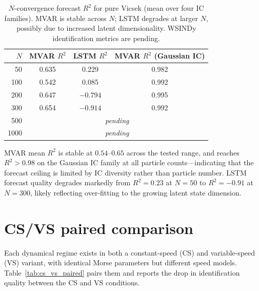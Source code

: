 \begin{table}[ht]
\centering
\caption{$N$-convergence forecast $R^2$ for pure Vicsek (mean over four
IC families).  MVAR is stable across $N$; LSTM degrades at larger $N$,
possibly due to increased latent dimensionality.  WSINDy identification
metrics are pending.}
\label{tab:n_convergence_forecast}
\renewcommand{\arraystretch}{0.95}
\small
\begin{tabular}{rccc}
\toprule
$N$ & \textbf{MVAR} $R^2$ & \textbf{LSTM} $R^2$ & \textbf{MVAR} $R^2$ (Gaussian IC) \\
\midrule
  50  & 0.635 &  0.229 & 0.982 \\
 100  & 0.542 &  0.085 & 0.992 \\
 200  & 0.647 & $-0.794$ & 0.995 \\
 300  & 0.654 & $-0.914$ & 0.992 \\
 500  & \multicolumn{3}{c}{\textit{pending}} \\
1000  & \multicolumn{3}{c}{\textit{pending}} \\
\bottomrule
\end{tabular}
\end{table}

MVAR mean $R^2$ is stable at $0.54$--$0.65$ across the tested range,
and reaches $R^2 > 0.98$ on the Gaussian IC family at all particle
counts---indicating that the forecast ceiling is limited by IC diversity
rather than particle number.  LSTM forecast quality degrades markedly
from $R^2{=}0.23$ at $N{=}50$ to $R^2{=}-0.91$ at $N{=}300$, likely
reflecting over-fitting to the growing latent state dimension.


\section{CS/VS paired comparison}
\label{sec:wsindy_cs_vs_paired}

Each dynamical regime exists in both a constant-speed (CS) and
variable-speed (VS) variant, with identical Morse parameters but
different speed models.  Table~\ref{tab:cs_vs_paired} pairs them and
reports the drop in identification quality between the CS and VS conditions.

